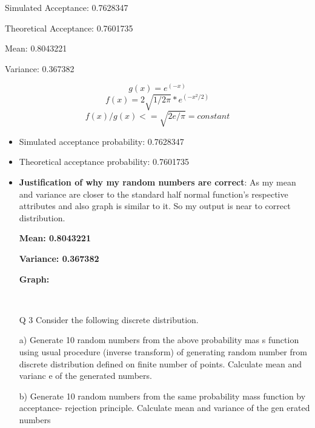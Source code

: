 \documentclass[11pt]{article}
\begin{document}

Simulated Acceptance:  0.7628347\

Theoretical Acceptance:  0.7601735\

Mean:  0.8043221\

Variance:  0.367382\


\begin{equation}
g(x)=e^{(-x)}
\end{equation}
\begin{equation}
f(x)=2\sqrt{1/2\pi} *e^{(-x^2/2)}
\end{equation}
\begin{equation}
f(x)/g(x)<=\sqrt{2e/\pi}=constant
\end{equation}
\begin{itemize}
	\item{Simulated acceptance probability: 0.7628347}
	\item{Theoretical acceptance probability: 0.7601735}
	\item{\textbf{Justification of why my random numbers are correct}: }
	As my mean and variance are closer to the standard half normal function's respective attributes and also graph is similar to it. So my output is near to correct distribution. 

	\textbf{Mean: 0.8043221}\

	\textbf{Variance: 0.367382}\

	\textbf{Graph: }\


\end{itemize}
\begin{figure}[H]
  \centering
 \\
\end{figure}

\begin{enumerate}
\item[Q 3] Consider the following discrete distribution.

a) Generate 10 random numbers from the above probability mas
s function using usual
procedure (inverse transform) of generating random number
from discrete distribution
defined on finite number of points. Calculate mean and varianc
e of the generated
numbers.\

b) Generate 10 random numbers from the same probability mass
function by acceptance-
rejection principle. Calculate mean and variance of the gen
erated numbers
\end{enumerate}
\end{document}
